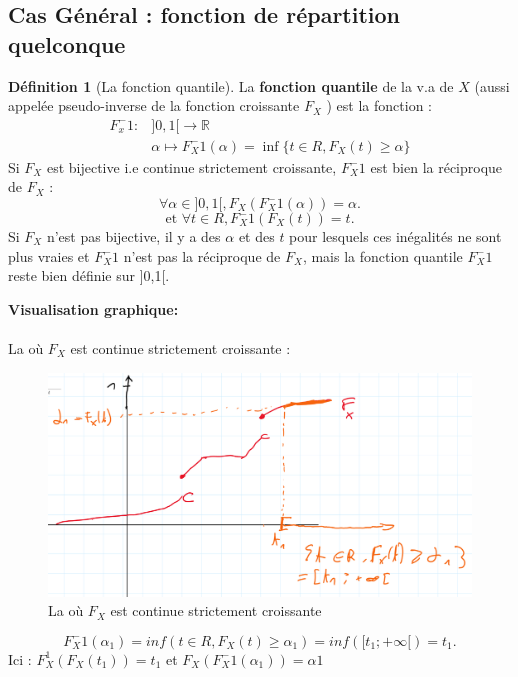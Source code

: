 \documentclass{article}
\theoremstyle{plain}%
\theoremstyle{definition}
\newtheorem{defn}{Définition}[section]
\theoremstyle{remark}
\begin{document}
    \subsection{Cas Général : fonction de répartition quelconque}
    \begin{defn}[La fonction quantile]
        La \textbf{fonction quantile} de la v.a de $ X $ (aussi appelée pseudo-inverse de la fonction croissante $ F_X $ ) est la fonction :
        \begin{align*}
            F_x^-1 : &]0,1[ \longrightarrow \mathbb{R} \\ 
                    & \alpha \mapsto F_X^-1(\alpha ) = \inf \{t \in R, F_X(t) \geq \alpha \}
        \end{align*} 
        Si $ F_X $ est bijective i.e continue strictement croissante, $ F_X^-1 $ est bien la réciproque de $ F_X $ : 
        \[
            \forall \alpha \in ]0,1[, F_X(F_X^-1(\alpha )) = \alpha 
        .\]
        \[
            \text{et } \forall t \in R, F_X^-1 ( F_X(t)) = t
        .\]
        Si $ F_X $ n'est pas bijective, il y a des $ \alpha  $ et des $ t $ pour lesquels ces inégalités ne sont plus vraies et $ F_X^-1 $ n'est pas la réciproque de $ F_X $, mais la fonction quantile $ F_X^-1 $ reste bien définie sur ]0,1[.
    \end{defn}




    \textbf{Visualisation graphique:} \\\\
    La où $ F_X $ est continue strictement croissante :  
    \begin{figure}[!htbp]
        \centering
        \includegraphics[width=.75\textwidth]{figures/figure1.png}
        \caption{La où $ F_X $ est continue strictement croissante}
        \label{}
    \end{figure}
    
    \[
        F_X^-1(\alpha _1) = inf({t \in R, F_X(t) \geq \alpha _1 }) = inf([t_1 ; +\infty[) = t_1
    .\]
    Ici : $ F_X^1 (F_X(t_1)) = t_1$ et $ F_X(F_X^-1(\alpha _1)) = \alpha 1$  \\\\
    
\end{document}
